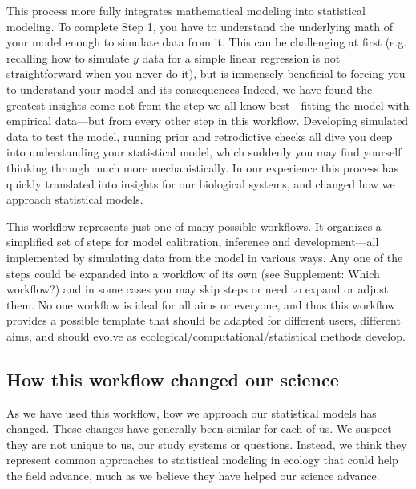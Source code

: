 \documentclass[11pt]{article}
\begin{document}
{This process more fully integrates mathematical modeling into statistical modeling. To complete Step 1, you have to understand the underlying math of your model enough to simulate data from it. This can be challenging at first (e.g. recalling how to simulate $y$ data for a simple linear regression is not straightforward when you never do it), but is immensely beneficial to forcing you to understand your model and its consequences Indeed, we have found the greatest insights come not from the step we all know best---fitting the model with empirical data---but from every other step in this workflow. Developing simulated data to test the model, running prior and retrodictive checks all dive you deep into understanding your statistical model, which suddenly you may find yourself thinking through much more mechanistically. In our experience this process has quickly translated into insights for our biological systems, and changed how we approach statistical models. %


This workflow represents just one of many possible workflows. It organizes a simplified set of steps for model calibration, inference and development---all implemented by simulating data from the model in various ways. Any one of the steps could be expanded into a workflow of its own (see Supplement: Which workflow?) and in some cases you may skip steps or need to expand or adjust them. No one workflow is ideal for all aims or everyone, and thus this workflow provides a possible template that should be adapted for different users, different aims, and should evolve as ecological/computational/statistical methods develop. 

\subsection{How this workflow changed our science} %

As we have used this workflow, how we approach our statistical models has changed. These changes have generally been similar for each of us. We suspect they are not unique to us, our study systems or questions. Instead, we think they represent common approaches to statistical modeling in ecology that could help the field advance, much as we believe they have helped our science advance. 

}
\end{document}
